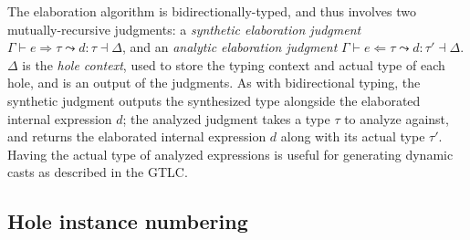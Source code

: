 The elaboration algorithm is bidirectionally-typed, and thus involves two mutually-recursive judgments: a \textit{synthetic elaboration judgment} $\Gamma\vdash e\Rightarrow\tau\leadsto d:\tau\dashv\Delta$, and an \textit{analytic elaboration judgment} $\Gamma\vdash e\Leftarrow\tau\leadsto d:\tau'\dashv\Delta$. $\Delta$ is the \textit{hole context}, used to store the typing context and actual type of each hole, and is an output of the judgments. As with bidirectional typing, the synthetic judgment outputs the synthesized type alongside the elaborated internal expression $d$; the analyzed judgment takes a type $\tau$ to analyze against, and returns the elaborated internal expression $d$ along with its actual type $\tau'$. Having the actual type of analyzed expressions is useful for generating dynamic casts as described in the GTLC.

\subsection{Hole instance numbering}
\label{sec:hole-instance-numbering}


